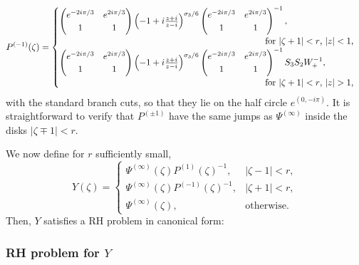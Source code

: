 \documentclass[11pt,fleqn]{article}
\numberwithin{equation}{section}
\begin{document}
    \begin{equation*}
    P^{(-1)}(\zeta)=
    \begin{cases}
    \begin{pmatrix}
        e^{-2 i \pi/3} & e^{2 i \pi/3}   \\
            1 & 1
    \end{pmatrix} \left(-1 + i{z + i \over z - i}\right)^{\sigma_3/6}
     \begin{pmatrix}
        e^{-2 i \pi/3} & e^{2 i \pi/3}   \\
            1 & 1
    \end{pmatrix}^{-1},\\
     \hspace{8cm}\mbox{ for $|\zeta+1|<r$, $|z|<1$,}\\
    \begin{pmatrix}
        e^{-2 i \pi/3} & e^{2 i \pi/3}   \\
            1 & 1
    \end{pmatrix} \left(-1 + i{z + i \over z - i}\right)^{\sigma_3/6}
     \begin{pmatrix}
        e^{-2 i \pi/3} & e^{2 i \pi/3}   \\
            1 & 1
    \end{pmatrix}^{-1}S_3S_2W_+^{-1},\\ \hspace{8cm}\mbox{ for $|\zeta+1|<r$, $|z|>1$,}\end{cases}
\end{equation*}
with the standard branch cuts, so that they lie on the half circle
$e^{(0,-i \pi)}$.
It is straightforward to verify that $P^{(\pm 1)}$ have the same jumps as $\Psi^{(\infty)}$ inside the disks $|\zeta\mp 1|<r$.



We now define for $r$ sufficiently small,
%
    $$Y(\zeta) = \begin{cases}\Psi^{(\infty)}(\zeta)P^{(1)}(\zeta)^{-1}, & |\zeta - 1| < r, \\
            \Psi^{(\infty)}(\zeta)P^{(-1)}(\zeta)^{-1}, & |\zeta + 1| < r, \\
            \Psi^{(\infty)}(\zeta), & \mbox{otherwise.}
    \end{cases}$$
%
Then, $Y$ satisfies a RH problem in canonical form:
%
\subsubsection*{RH problem for $Y$}
\end{document}
